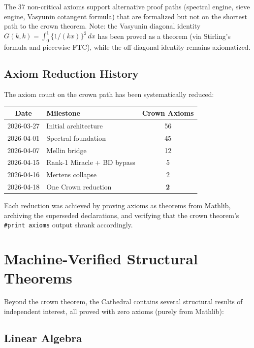 \documentclass[11pt,a4paper]{article}
\theoremstyle{plain}
\theoremstyle{definition}
\theoremstyle{remark}
\newcommand{\fract}[1]{\{#1\}}
\newcommand{\lean}[1]{\texttt{#1}}
\begin{document}
The 37 non-critical axioms support alternative proof paths
(spectral engine, sieve engine, Vasyunin cotangent formula) that
are formalized but not on the shortest path to the crown theorem.
Note: the Vasyunin diagonal identity $G(k,k) = \int_0^1 \fract{1/(kx)}^2\,dx$
has been proved as a theorem (via Stirling's formula and piecewise FTC),
while the off-diagonal identity remains axiomatized.

\subsection{Axiom Reduction History}

The axiom count on the crown path has been systematically reduced:

\begin{center}
\begin{tabular}{@{}clc@{}}
\toprule
\textbf{Date} & \textbf{Milestone} & \textbf{Crown Axioms} \\
\midrule
2026-03-27 & Initial architecture & 56 \\
2026-04-01 & Spectral foundation & 45 \\
2026-04-07 & Mellin bridge & 12 \\
2026-04-15 & Rank-1 Miracle + BD bypass & 5 \\
2026-04-16 & Mertens collapse & 2 \\
2026-04-18 & One Crown reduction & \textbf{2} \\
\bottomrule
\end{tabular}
\end{center}

Each reduction was achieved by proving axioms as theorems from
Mathlib, archiving the superseded declarations, and verifying
that the crown theorem's \lean{\#print axioms} output shrank
accordingly.

\section{Machine-Verified Structural Theorems}
\label{sec:structural}

Beyond the crown theorem, the Cathedral contains several structural
results of independent interest, all proved with zero axioms
(purely from Mathlib):

\subsection{Linear Algebra}
\end{document}
